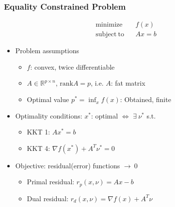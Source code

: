 \subsubsection*{Equality Constrained Problem}
$$ \begin{aligned}
    \mathrm{minimize}~~&~~f(x) \\
    \mathrm{subject~to}~~&~~Ax=b
\end{aligned} $$
\begin{itemize}
    \item Problem assumptions
    \begin{itemize}
        \item $f$: convex, twice differentiable
        \item $A\in\mathbb{R}^{p\times n}$, $\mathrm{rank}A=p$, i.e. $A$: fat matrix
        \item Optimal value $p^\ast = \inf_x f(x)$: Obtained, finite
    \end{itemize}
    \newpage
    \item Optimality conditions: $x^\ast$: optimal $\Leftrightarrow$ $\exists~\nu^\ast$ s.t.
    \begin{itemize}
        \item KKT 1: $Ax^\ast=b$
        \item KKT 4: $\nabla f(x^\ast)+A^T\nu^\ast=0$
    \end{itemize}
    \item Objective: residual(error) functions $\rightarrow~0$
    \begin{itemize}
        \item Primal residual: $r_p(x,\nu)=Ax-b$
        \item Dual residual: $r_d(x,\nu)=\nabla f(x)+A^T\nu$
    \end{itemize}
\end{itemize}

